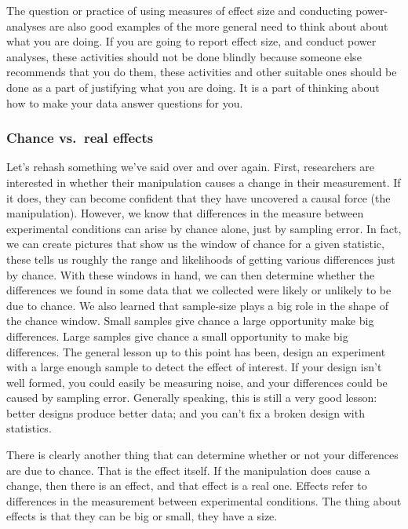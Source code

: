 \documentclass[
  letterpaper,
  DIV=11,
  numbers=noendperiod]{scrartcl}
\begin{document}
The question or practice of using measures of effect size and conducting
power-analyses are also good examples of the more general need to think
about about what you are doing. If you are going to report effect size,
and conduct power analyses, these activities should not be done blindly
because someone else recommends that you do them, these activities and
other suitable ones should be done as a part of justifying what you are
doing. It is a part of thinking about how to make your data answer
questions for you.

\hypertarget{chance-vs.-real-effects}{%
\subsubsection{Chance vs.~real effects}\label{chance-vs.-real-effects}}

Let's rehash something we've said over and over again. First,
researchers are interested in whether their manipulation causes a change
in their measurement. If it does, they can become confident that they
have uncovered a causal force (the manipulation). However, we know that
differences in the measure between experimental conditions can arise by
chance alone, just by sampling error. In fact, we can create pictures
that show us the window of chance for a given statistic, these tells us
roughly the range and likelihoods of getting various differences just by
chance. With these windows in hand, we can then determine whether the
differences we found in some data that we collected were likely or
unlikely to be due to chance. We also learned that sample-size plays a
big role in the shape of the chance window. Small samples give chance a
large opportunity make big differences. Large samples give chance a
small opportunity to make big differences. The general lesson up to this
point has been, design an experiment with a large enough sample to
detect the effect of interest. If your design isn't well formed, you
could easily be measuring noise, and your differences could be caused by
sampling error. Generally speaking, this is still a very good lesson:
better designs produce better data; and you can't fix a broken design
with statistics.

There is clearly another thing that can determine whether or not your
differences are due to chance. That is the effect itself. If the
manipulation does cause a change, then there is an effect, and that
effect is a real one. Effects refer to differences in the measurement
between experimental conditions. The thing about effects is that they
can be big or small, they have a size.
\end{document}

